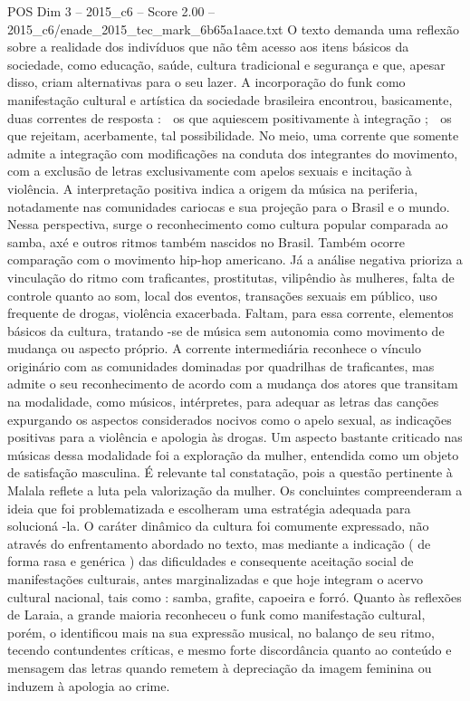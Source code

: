\begin{textsample}{POS Dim 3 – 2015\_c6 – Score 2.00 – 2015\_c6/enade\_2015\_tec\_mark\_6b65a1aace.txt}
O texto demanda uma reflexão sobre a realidade dos indivíduos que não têm acesso aos itens básicos da sociedade, como educação, saúde, cultura tradicional e segurança e que, apesar disso, criam alternativas para o seu lazer.
A incorporação do funk como manifestação cultural e artística da sociedade brasileira encontrou, basicamente, duas correntes de resposta :  os que aquiescem positivamente à integração ;  os que rejeitam, acerbamente, tal possibilidade.
No meio, uma corrente que somente admite a integração com modificações na conduta dos integrantes do movimento, com a exclusão de letras exclusivamente com apelos sexuais e incitação à violência.
A interpretação positiva indica a origem da música na periferia, notadamente nas comunidades cariocas e sua projeção para o Brasil e o mundo.
Nessa perspectiva, surge o reconhecimento como cultura popular comparada ao samba, axé e outros ritmos também nascidos no Brasil.
Também ocorre comparação com o movimento hip-hop americano.
Já a análise negativa prioriza a vinculação do ritmo com traficantes, prostitutas, vilipêndio às mulheres, falta de controle quanto ao som, local dos eventos, transações sexuais em público, uso frequente de drogas, violência exacerbada.
Faltam, para essa corrente, elementos básicos da cultura, tratando -se de música sem autonomia como movimento de mudança ou aspecto próprio.
A corrente intermediária reconhece o vínculo originário com as comunidades dominadas por quadrilhas de traficantes, mas admite o seu reconhecimento de acordo com a mudança dos atores que transitam na modalidade, como músicos, intérpretes, para adequar as letras das canções expurgando os aspectos considerados nocivos como o apelo sexual, as indicações positivas para a violência e apologia às drogas.
Um aspecto bastante criticado nas músicas dessa modalidade foi a exploração da mulher, entendida como um objeto de satisfação masculina.
É relevante tal constatação, pois a questão pertinente à Malala reflete a luta pela valorização da mulher.
Os concluintes compreenderam a ideia que foi problematizada e escolheram uma estratégia adequada para solucioná -la.
O caráter dinâmico da cultura foi comumente expressado, não através do enfrentamento abordado no texto, mas mediante a indicação ( de forma rasa e genérica ) das dificuldades e consequente aceitação social de manifestações culturais, antes marginalizadas e que hoje integram o acervo cultural nacional, tais como : samba, grafite, capoeira e forró.
Quanto às reflexões de Laraia, a grande maioria reconheceu o funk como manifestação cultural, porém, o identificou mais na sua expressão musical, no balanço de seu ritmo, tecendo contundentes críticas, e mesmo forte discordância quanto ao conteúdo e mensagem das letras quando remetem à depreciação da imagem feminina ou induzem à apologia ao crime.

\end{textsample}
